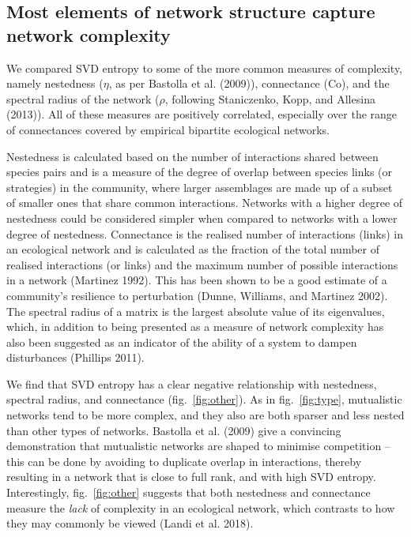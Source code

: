 \documentclass[11pt]{article}
\begin{document}
\hypertarget{most-elements-of-network-structure-capture-network-complexity}{%
\subsection{Most elements of network structure capture network
complexity}\label{most-elements-of-network-structure-capture-network-complexity}}

We compared SVD entropy to some of the more common measures of
complexity, namely nestedness (\(\eta\), as per Bastolla et al. (2009)),
connectance (\(\text{Co}\)), and the spectral radius of the network
(\(\rho\), following Staniczenko, Kopp, and Allesina (2013)). All of
these measures are positively correlated, especially over the range of
connectances covered by empirical bipartite ecological networks.

Nestedness is calculated based on the number of interactions shared
between species pairs and is a measure of the degree of overlap between
species links (or strategies) in the community, where larger assemblages
are made up of a subset of smaller ones that share common interactions.
Networks with a higher degree of nestedness could be considered simpler
when compared to networks with a lower degree of nestedness. Connectance
is the realised number of interactions (links) in an ecological network
and is calculated as the fraction of the total number of realised
interactions (or links) and the maximum number of possible interactions
in a network (Martinez 1992). This has been shown to be a good estimate
of a community's resilience to perturbation (Dunne, Williams, and
Martinez 2002). The spectral radius of a matrix is the largest absolute
value of its eigenvalues, which, in addition to being presented as a
measure of network complexity has also been suggested as an indicator of
the ability of a system to dampen disturbances (Phillips 2011).

We find that SVD entropy has a clear negative relationship with
nestedness, spectral radius, and connectance (fig.~\ref{fig:other}). As
in fig.~\ref{fig:type}, mutualistic networks tend to be more complex,
and they also are both sparser and less nested than other types of
networks. Bastolla et al. (2009) give a convincing demonstration that
mutualistic networks are shaped to minimise competition -- this can be
done by avoiding to duplicate overlap in interactions, thereby resulting
in a network that is close to full rank, and with high SVD entropy.
Interestingly, fig.~\ref{fig:other} suggests that both nestedness and
connectance measure the \emph{lack} of complexity in an ecological
network, which contrasts to how they may commonly be viewed (Landi et
al. 2018).
\end{document}
